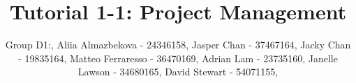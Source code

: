 \documentclass{report}
\title{Tutorial 1-1: Project Management}
\author{
	Group D1:,
	Aliia Almazbekova - 24346158,
	Jasper Chan - 37467164,
	Jacky Chan - 19835164,
	Matteo Ferraresso - 36470169,
	Adrian Lam - 23735160,
	Janelle Lawson - 34680165,
	David Stewart - 54071155,
}
\begin{document}
\maketitle

\begin{sidewaysfigure}
	\centering
	\noindent{}
\end{sidewaysfigure}

\begin {sidewaysfigure}[h]
	\centering
	\noindent{}
\end{sidewaysfigure}
\end{document}
